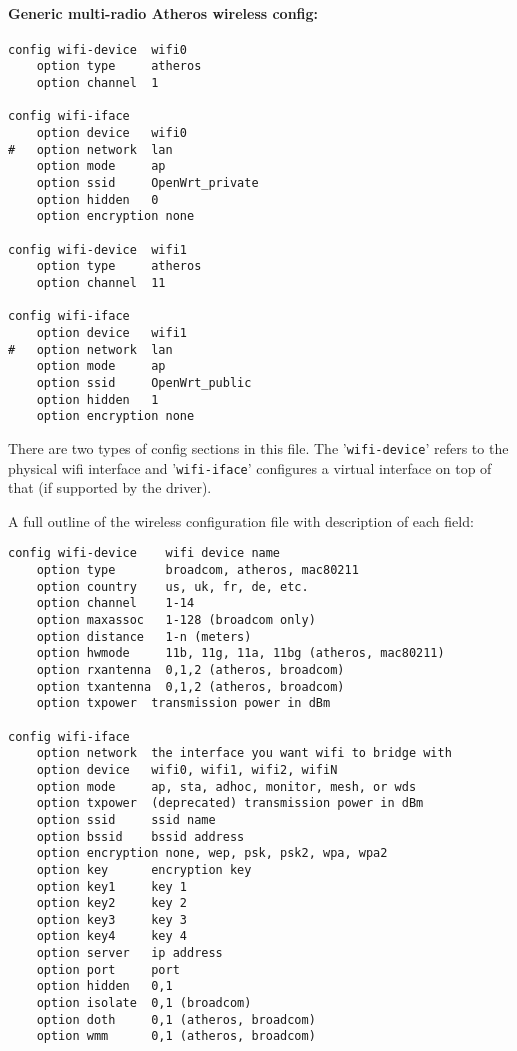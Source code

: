 \paragraph{Generic multi-radio Atheros wireless config:}

\begin{Verbatim}
config wifi-device  wifi0
    option type     atheros
    option channel  1

config wifi-iface
    option device   wifi0
#   option network  lan
    option mode     ap
    option ssid     OpenWrt_private
    option hidden   0
    option encryption none

config wifi-device  wifi1
    option type     atheros
    option channel  11

config wifi-iface
    option device   wifi1
#   option network  lan
    option mode     ap
    option ssid     OpenWrt_public
    option hidden   1
    option encryption none
\end{Verbatim}

There are two types of config sections in this file. The '\texttt{wifi-device}' refers to
the physical wifi interface and '\texttt{wifi-iface}' configures a virtual interface on top
of that (if supported by the driver).

A full outline of the wireless configuration file with description of each field:

\begin{Verbatim}
config wifi-device    wifi device name
    option type       broadcom, atheros, mac80211
    option country    us, uk, fr, de, etc.
    option channel    1-14
    option maxassoc   1-128 (broadcom only)
    option distance   1-n (meters)
    option hwmode     11b, 11g, 11a, 11bg (atheros, mac80211)
    option rxantenna  0,1,2 (atheros, broadcom)
    option txantenna  0,1,2 (atheros, broadcom)
    option txpower  transmission power in dBm

config wifi-iface
    option network  the interface you want wifi to bridge with
    option device   wifi0, wifi1, wifi2, wifiN
    option mode     ap, sta, adhoc, monitor, mesh, or wds
    option txpower  (deprecated) transmission power in dBm
    option ssid     ssid name
    option bssid    bssid address
    option encryption none, wep, psk, psk2, wpa, wpa2
    option key      encryption key
    option key1     key 1
    option key2     key 2
    option key3     key 3
    option key4     key 4
    option server   ip address
    option port     port
    option hidden   0,1
    option isolate  0,1	(broadcom)
    option doth     0,1	(atheros, broadcom)
    option wmm      0,1	(atheros, broadcom)
\end{Verbatim}


